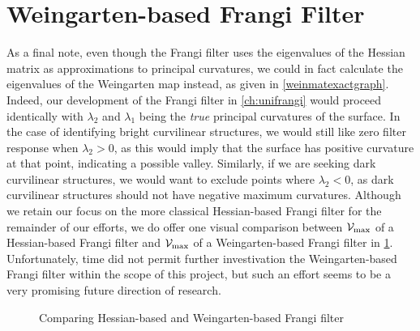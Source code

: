 \section{Weingarten-based Frangi Filter} \label{sec:wein-frangi}

As a final note, even though the Frangi filter uses the eigenvalues of the Hessian matrix as approximations to principal curvatures, we could in fact calculate the eigenvalues of the Weingarten map instead, as given in \cref{weinmatexactgraph}. Indeed, our development of the Frangi filter in \cref{ch:unifrangi} would proceed identically with $\lambda_2$ and $\lambda_1$ being the \textit{true} principal curvatures of the surface. In the case of identifying bright curvilinear structures, we would still like zero filter response when $\lambda_2 > 0$, as this would imply that the surface has positive curvature at that point, indicating a possible valley. Similarly, if we are seeking dark curvilinear structures, we would want to exclude points where $\lambda_2 < 0$, as dark curvilinear structures should not have negative maximum curvatures. Although we retain our focus on the more classical Hessian-based Frangi filter for the remainder of our efforts, we do offer one visual comparison between $\mathcal{V}_{\max}$ of a Hessian-based Frangi filter and  $\mathcal{V}_{\max}$ of a Weingarten-based Frangi filter in \cref{fig:compare-wein-hess-Vmax}.
Unfortunately, time did not permit further investivation the Weingarten-based Frangi filter within the scope of this project, but such an effort seems to be a very promising future direction of research.

\begin{figure}[t]\centering
\caption{Comparing Hessian-based and Weingarten-based Frangi filter}
\label{fig:compare-wein-hess-Vmax}
\end{figure}

